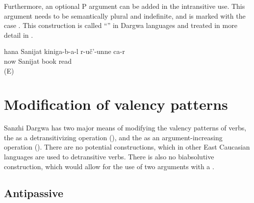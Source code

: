 Furthermore, an optional P argument can be added in the intransitive use. This argument needs to be semantically plural and indefinite, and is marked with the  case . This construction is called ``'' in Dargwa languages and treated in more detail in . 
%
\begin{exe}
	\ex	\label{ex:Now Sanijat reads books}
	\gll	hana Sanijat kiniga-b-a-l	r-uč'-unne	ca-r\\
		now	Sanijat	book	read	\\
	\glt	{} (E)
\end{exe}


\section{Modification of valency patterns}
\label{cpt:Modification of valency patterns}

Sanzhi Dargwa has two major means of modifying the valency patterns of verbs, the  as a detransitivizing operation (), and the  as an argument-increasing operation (). There are no potential constructions, which in other East Caucasian languages are used to detransitive verbs. There is also no biabsolutive construction, which would allow for the use of two  arguments with a .



\subsection{Antipassive}
\label{sec:Antipassive}

